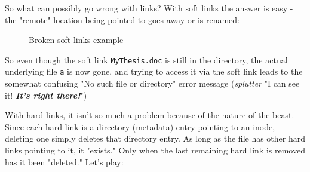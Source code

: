 \documentclass[10pt,american,]{book}
\newenvironment{Shaded}{\begin{snugshade}}{\end{snugshade}}
\newcommand{\KeywordTok}[1]{\textcolor[rgb]{0.13,0.29,0.53}{\textbf{{#1}}}}
\newcommand{\NormalTok}[1]{{#1}}
\numberwithin{figure}{chapter}
\DeclareRobustCommand{\drcap}[1]{\begin{figure}[H]\caption{#1}\end{figure}}
\renewcommand{\KeywordTok}[1]{{#1}}
\renewcommand{\NormalTok}[1]{{#1}}
\begin{document}
So what can possibly go wrong with links? With soft links the answer is
easy - the "remote" location being pointed to goes away or is renamed:

\drcap{Broken soft links example}

\begin{Shaded}
\end{Shaded}

So even though the soft link \texttt{MyThesis.doc} is still in the
directory, the actual underlying file \texttt{a} is now gone, and trying
to access it via the soft link leads to the somewhat confusing "No such
file or directory" error message (\emph{splutter} "I can see it!
\textbf{\emph{It's right there!}}")

With hard links, it isn't so much a problem because of the nature of the
beast. Since each hard link is a directory (metadata) entry pointing to
an inode, deleting one simply deletes that directory entry. As long as
the file has other hard links pointing to it, it "exists." Only when the
last remaining hard link is removed has it been "deleted." Let's play:
\end{document}
